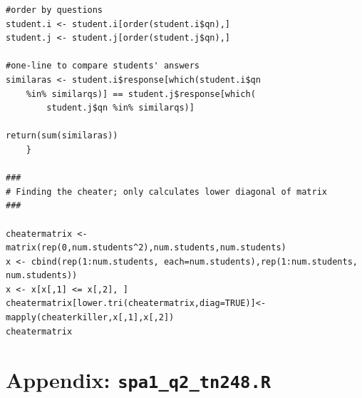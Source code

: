 \documentclass[10pt, oneside, reqno]{article}
\theoremstyle{plain}
\begin{document}
\begin{lstlisting}
#order by questions
student.i <- student.i[order(student.i$qn),]
student.j <- student.j[order(student.j$qn),]

#one-line to compare students' answers
similaras <- student.i$response[which(student.i$qn 
	%in% similarqs)] == student.j$response[which(
		student.j$qn %in% similarqs)]

return(sum(similaras))
	}
	
###
# Finding the cheater; only calculates lower diagonal of matrix
###

cheatermatrix <- matrix(rep(0,num.students^2),num.students,num.students)
x <- cbind(rep(1:num.students, each=num.students),rep(1:num.students, num.students))
x <- x[x[,1] <= x[,2], ]
cheatermatrix[lower.tri(cheatermatrix,diag=TRUE)]<-mapply(cheaterkiller,x[,1],x[,2])
cheatermatrix
\end{lstlisting}


\newpage

\section{Appendix: \texttt{spa1\_q2\_tn248.R}} %
\label{sec:appendix_texttt_spa1_q2_tn248_r}
\end{document}
